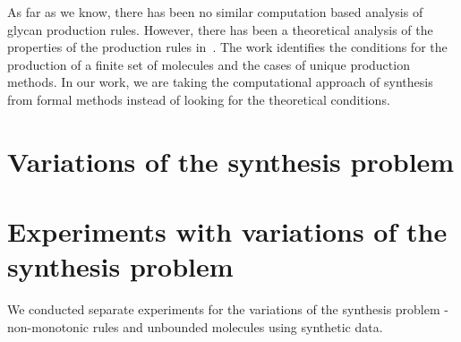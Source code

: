 As far as we know, there has been no similar computation based analysis of glycan production rules.
%
However, there has been a theoretical analysis of the properties of the production
rules in~\cite{Jaiman2018}. The work identifies the conditions for the production
of a finite set of molecules and the cases of unique production methods.
%
In our work, we are taking the computational approach of synthesis from formal methods
instead of looking for the theoretical conditions.

\section{Variations of the synthesis problem}
\label{sec:variations}


\section{Experiments with variations of the synthesis problem}
\label{sec:ex-variants}
We conducted separate experiments for the variations of the synthesis problem - non-monotonic rules and unbounded molecules using synthetic data.
%
